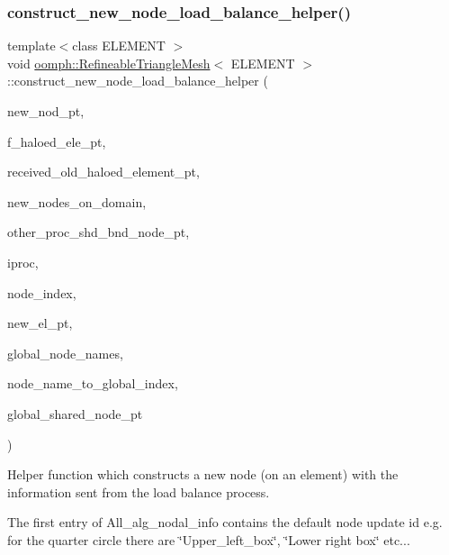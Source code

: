 \subsubsection{\texorpdfstring{construct\+\_\+new\+\_\+node\+\_\+load\+\_\+balance\+\_\+helper()}{construct\_new\_node\_load\_balance\_helper()}}
{\footnotesize\ttfamily template$<$class E\+L\+E\+M\+E\+NT $>$ \\
void \hyperlink{classoomph_1_1RefineableTriangleMesh}{oomph\+::\+Refineable\+Triangle\+Mesh}$<$ E\+L\+E\+M\+E\+NT $>$\+::construct\+\_\+new\+\_\+node\+\_\+load\+\_\+balance\+\_\+helper (\begin{DoxyParamCaption}\item[{Node $\ast$\&}]{new\+\_\+nod\+\_\+pt,  }\item[{Vector$<$ Vector$<$ Finite\+Element $\ast$$>$ $>$ \&}]{f\+\_\+haloed\+\_\+ele\+\_\+pt,  }\item[{Vector$<$ Vector$<$ std\+::map$<$ unsigned, Finite\+Element $\ast$$>$ $>$ $>$ \&}]{received\+\_\+old\+\_\+haloed\+\_\+element\+\_\+pt,  }\item[{Vector$<$ Node $\ast$$>$ \&}]{new\+\_\+nodes\+\_\+on\+\_\+domain,  }\item[{Vector$<$ Vector$<$ Vector$<$ std\+::map$<$ unsigned, Node $\ast$$>$ $>$ $>$ $>$ \&}]{other\+\_\+proc\+\_\+shd\+\_\+bnd\+\_\+node\+\_\+pt,  }\item[{unsigned \&}]{iproc,  }\item[{unsigned \&}]{node\+\_\+index,  }\item[{Finite\+Element $\ast$const \&}]{new\+\_\+el\+\_\+pt,  }\item[{Vector$<$ Vector$<$ Vector$<$ unsigned $>$ $>$ $>$ \&}]{global\+\_\+node\+\_\+names,  }\item[{std\+::map$<$ Vector$<$ unsigned $>$, unsigned $>$ \&}]{node\+\_\+name\+\_\+to\+\_\+global\+\_\+index,  }\item[{Vector$<$ Node $\ast$$>$ \&}]{global\+\_\+shared\+\_\+node\+\_\+pt }\end{DoxyParamCaption})\hspace{0.3cm}{\ttfamily [protected]}}



Helper function which constructs a new node (on an element) with the information sent from the load balance process. 

The first entry of All\+\_\+alg\+\_\+nodal\+\_\+info contains the default node update id e.\+g. for the quarter circle there are \char`\"{}\+Upper\+\_\+left\+\_\+box\char`\"{}, \char`\"{}\+Lower right box\char`\"{} etc...

